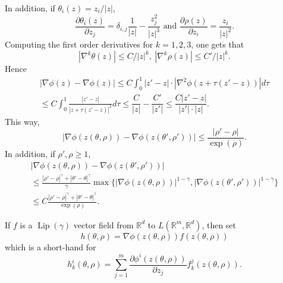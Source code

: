 \documentclass[a4paper,12pt]{article}
\theoremstyle{definition}
\newcommand{\RR}{\mathbb{R}}
\DeclareMathOperator{\Lip}{Lip}
\begin{document}
In addition, if $\theta_i(z)=z_i/|z|$, 
\begin{equation*}
\frac{\partial \theta_i(z)}{\partial z_j}=\delta_{i,j}\frac{1}{|z|}
-\frac{z_j^2}{|z|^3}\text{ and }
\frac{\partial \rho(z)}{\partial z_i}=\frac{z_i}{|z|^2}.
\end{equation*}
Computing the first order derivatives for $k=1,2,3$, one gets that
\begin{equation*}
|\nabla^k \theta(z)|\leq C/|z|^k,\ 
|\nabla^k \rho(z)|\leq C'/|z|^k.
\end{equation*}
Hence
\begin{multline}
\label{eq-12}
|\nabla \phi(z)-\nabla \phi(z)|
\leq C
\int_0^1 |z'-z|\cdot |\nabla^{2}\phi(z+\tau(z'-z))|d\tau\\
\leq C\int_0^1 \frac{|z'-z|}{|z+\tau(z'-z)|^2}d\tau
\leq \dfrac{C}{|z|}-\dfrac{C'}{|z'|}\leq \dfrac{C|z'-z|}{|z'|\cdot|z|}.
\end{multline}
This way, 
\begin{equation}
\label{eq-8}
|\nabla \phi(z(\theta,\rho))-\nabla \phi(z(\theta',\rho'))|
\leq \frac{|\rho'-\rho|}{\exp(\rho)}.
\end{equation}
In addition, if $\rho',\rho\geq 1$, 
\begin{multline}
\label{eq-9}
|\nabla \phi(z(\theta,\rho))-\nabla \phi(z(\theta',\rho'))|\\
\leq \frac{|\rho'-\rho|^\gamma+|\theta'-\theta|^\gamma}{\gamma}\max\{|\nabla\phi(z(\theta,\rho))|^{1-\gamma},
|\nabla\phi(z(\theta',\rho'))|^{1-\gamma}\}\\
\leq C \frac{|\rho'-\rho|^\gamma+|\theta'-\theta|^\gamma}{\exp(\rho)}.
\end{multline}

If $f$ is a $\Lip(\gamma)$ vector field from $\RR^d$ to $L(\RR^m,\RR^d)$, then
set 
\begin{equation*}
h(\theta,\rho)=\nabla \phi(z(\theta,\rho))f(z(\theta,\rho))
\end{equation*}
which is a short-hand for
\begin{equation}
\label{eq-30}
h^i_k(\theta,\rho)=\sum_{j=1}^m \frac{\partial \phi^i(z(\theta,\rho))}{\partial z_j}f^j_k(z(\theta,\rho)).
\end{equation}
\end{document}
